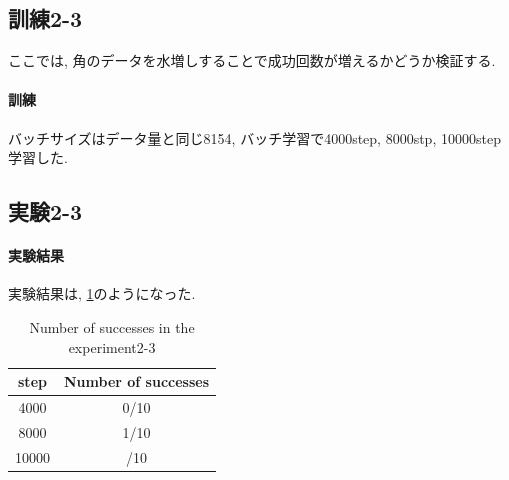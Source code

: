 \subsection{訓練2-3}
ここでは, 角のデータを水増しすることで成功回数が増えるかどうか検証する. 

\paragraph{訓練}
バッチサイズはデータ量と同じ8154, バッチ学習で4000step, 8000stp, 10000step学習した. 

\subsection{実験2-3}

\paragraph{実験結果}
実験結果は, \ref{tb:exp4}のようになった. 

\begin{table}[h]
  \centering
  \begin{tabular}{|c|c|} \hline
    step & Number of successes \\ \hline
    4000 & 0/10 \\ \hline
    8000 & 1/10 \\ \hline
    10000 & /10 \\ \hline
  \end{tabular}
  \caption{Number of successes in the experiment2-3}
  \label{tb:exp4}
\end{table}